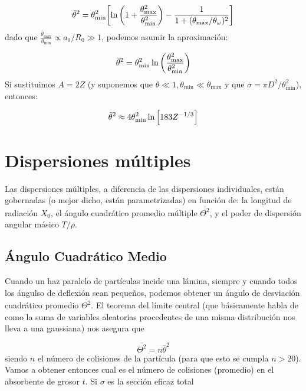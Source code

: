 \begin{equation}
    \bar{\theta}^2 = \theta_{\min}^2 \bqty{\ln \pqty{1+\frac{\theta^2_{\max}}{\theta^2_{\min}}} - \frac{1}{1+(\theta_{\max}/\theta_{\omega})^2}}  
\end{equation}
dado que $ \frac{\bar{\theta}_{\max}}{\theta_{\min}} \propto a_0 /R_0 \gg 1$, podemos asumir la aproximación: 

\begin{equation}
    \bar{\theta}^2 = \theta_{\min}^2 \ln \pqty{\frac{\theta_{\max}^2}{\theta_{\min}^2}}    \label{Ec:02-AnguloCuadraticoPromedio}
\end{equation}
Si sustituimos $A=2Z$ (y suponemos que $\theta \ll 1, \theta_{\min} \ll \theta_{\max}$ y que $\sigma = \pi D^2 / \theta_{\min}^2$), entonces: 

\begin{equation}
    \bar{\theta}^2 \approx  4 \theta_{\min}^2 \ln \bqty{183 Z^{-1/3}}  \label{Ec:02-AnguloCuadraticoPromedio2}
\end{equation}

\section{Dispersiones múltiples}

Las dispersiones múltiples, a diferencia de las dispersiones individuales, están gobernadas (o mejor dicho, están parametrizadas) en función de: la longitud de radiación $X_0$, el ángulo cuadrático promedio múltiple $\overline{\Theta^2}$, y el poder de dispersión angular másico $T/\rho$. 

\subsection{Ángulo Cuadrático Medio}

Cuando un haz paralelo de partículas incide una lámina, siempre y cuando todos los ángulso de deflexión sean pequeños, podemos obtener un ángulo de desviación cuadrático promedio $\overline{\Theta^2}$. El teorema del límite central (que básicamente habla de como la suma de variables aleatorias procedentes de una misma distribución nos lleva a una gaussiana) nos asegura que 

\begin{equation}
    \overline{\Theta^2} = n \bar{\theta}^2 
\end{equation} 
siendo $n$ el número de colisiones de la partícula (para que esto se cumpla $n>20$).  Vamos a obtener entonces cual es el número de colisiones (promedio) en el absorbente de grosor $t$. Si $\sigma$ es la sección eficaz total

